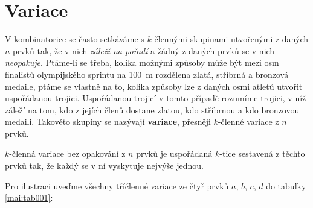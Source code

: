     

  \section{Variace}\label{mai:IchapIVcsecII}
    V kombinatorice se často setkáváme s \(k\)-člennými skupinami utvořenými z daných \(n\) prvků
    tak, že v nich \emph{záleží na pořadí} a žádný z daných prvků se v nich \emph{neopakuje}.
    Ptáme-li se třeba, kolika možnými způsoby může být mezi osm finalistů olympijského sprintu na
    \qty{100}{\m} rozdělena zlatá, stříbrná a bronzová medaile, ptáme se vlastně na to, kolika
    způsoby lze z daných osmi atletů utvořit uspořádanou trojici. Uspořádanou trojicí v tomto
    případě rozumíme trojici, v níž záleží na tom, kdo z jejích členů dostane zlatou, kdo stříbrnou
    a kdo bronzovou medaili. Takovéto skupiny se nazývají \textbf{variace}, přesněji \(k\)-členné
    variace z \(n\) prvků.

    \begin{mdframed}[style=highlight] \(k\)-členná variace bez opakování z \(n\) prvků je uspořádaná
      \(k\)-tice sestavená z těchto prvků tak, že každý se v ní vyskytuje nejvýše jednou.
    \end{mdframed}
    
    Pro ilustraci uveďme všechny tříčlenné variace ze čtyř prvků \(a\), \(b\), \(c\), \(d\) do
    tabulky \ref{mai:tab001}:
    \begin{table}[ht!]      %
      \centering
      \caption{Tříčlenné variace ze čtyř prvků \(a\), \(b\), \(c\), \(d\)}
      \label{mai:tab001}
    \end{table}

